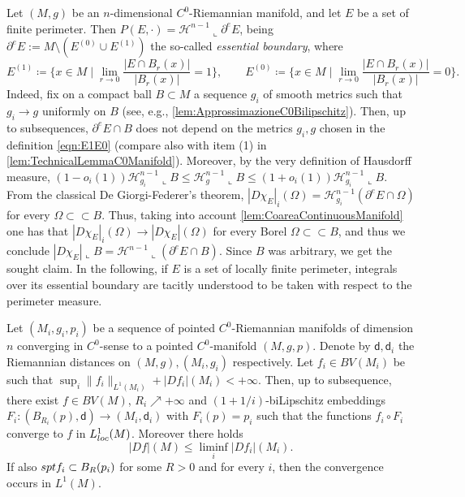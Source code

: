\documentclass[a4paper,12pt,reqno]{amsart}
\numberwithin{equation}{section}
\theoremstyle{plain}
\theoremstyle{definition}
\theoremstyle{remark}
\newcommand{\dist}{\mathsf{d}}
\begin{document}
{\begin{remark}\label{rem:RepresentationPerimeter}
    Let $(M,g)$ be an $n$-dimensional $C^0$-Riemannian manifold, and let $E$ be a set of finite perimeter. Then $P(E,\cdot)=\mathcal{H}^{n-1}\llcorner \partial^eE$, being  $\partial^eE:=M\setminus (E^{(0)}\cup E^{(1)})$ the so-called \emph{essential boundary}, where
\begin{equation}\label{eqn:E1E0}
E^{(1)}\coloneqq\bigg\{x\in M\;\bigg|\;\lim_{r\to 0}\frac{|E\cap B_r(x)|}{|B_r(x)|}=1\bigg\},\qquad
E^{(0)}\coloneqq\bigg\{x\in M\;\bigg|\;\lim_{r\to 0}\frac{|E\cap B_r(x)|}{|B_r(x)|}=0\bigg\}.
\end{equation} 
Indeed, fix on a compact ball $B\subset M$ a sequence $g_i$ of smooth metrics such that $g_i\to g$ uniformly on $B$ (see, e.g., \cref{lem:ApprossimazioneC0Bilipschitz}). Then, up to subsequences, $\partial^e E\cap B$ does not depend on the metrics $g_i,g$ chosen in the definition \eqref{eqn:E1E0} (compare also with item (1) in \cref{lem:TechnicalLemmaC0Manifold}). Moreover, by the very definition of Hausdorff measure, $(1-o_i(1))\mathcal{H}^{n-1}_{g_i}\llcorner B \leq \mathcal{H}^{n-1}_{g}\llcorner B \leq (1+o_i(1))\mathcal{H}^{n-1}_{g_i}\llcorner B$. From the classical De Giorgi-Federer's theorem, $|D\chi_E|_i(\Omega)=\mathcal{H}^{n-1}_{g_i}(\partial^eE\cap \Omega)$ for every $\Omega\subset\subset B$. Thus, taking into account \cref{lem:CoareaContinuousManifold} one has that $|D\chi_E|_i(\Omega)\to |D\chi_E|(\Omega)$ for every Borel $\Omega\subset\subset B$, and thus we conclude $|D\chi_E|\llcorner B=\mathcal{H}^{n-1}\llcorner (\partial^e E\cap B)$. Since $B$ was arbitrary, we get the sought claim. In the following, if $E$ is a set of locally finite perimeter, integrals over its essential boundary are tacitly understood to be taken with respect to the perimeter measure.
\end{remark}

\begin{lemma}\label{lem:PrecompactnessBV}
    Let $(M_i,g_i,p_i)$ be a sequence of pointed $C^0$-Riemannian manifolds of dimension $n$ converging in $C^0$-sense to a pointed $C^0$-manifold $(M,g,p)$. Denote by $\dist, \dist_i$ the Riemannian distances on $(M,g), (M_i,g_i)$ respectively. Let $f_i \in BV(M_i)$ be such that $\sup_i \| f_i\|_{L^1(M_i)} + |D f_i|(M_i) <+\infty$.
    Then, up to subsequence, there exist $f \in BV(M)$, $R_i\nearrow+\infty$ and $(1+1/i)$-biLipschitz embeddings $F_i: (B_{R_i}(p), \dist)\to (M_i,\dist_i)$ with $F_i(p)=p_i$ such that the functions $f_i\circ F_i$ converge to $f$ in $L^1_{\rm loc}(M)$. Moreover there holds
    \[
    |D f|(M) \le \liminf_i |D f_i|(M_i).
    \]
    If also ${\rm spt} f_i \subset B_R(p_i)$ for some $R>0$ and for every $i$, then the convergence occurs in $L^1(M)$.
\end{lemma}

}
\end{document}
